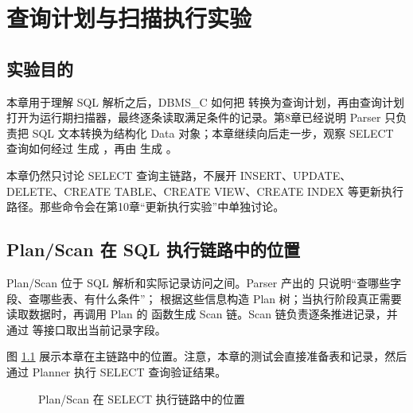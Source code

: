 \chapter{查询计划与扫描执行实验}
\label{chap:plan-scan}

\section{实验目的}
\label{sec:plan-scan-purpose}

本章用于理解 SQL 解析之后，DBMS\_C 如何把  转换为查询计划，再由查询计划打开为运行期扫描器，最终逐条读取满足条件的记录。第8章已经说明 Parser 只负责把 SQL 文本转换为结构化 Data 对象；本章继续向后走一步，观察 SELECT 查询如何经过  生成 ，再由  生成 。

本章仍然只讨论 SELECT 查询主链路，不展开 INSERT、UPDATE、DELETE、CREATE TABLE、CREATE VIEW、CREATE INDEX 等更新执行路径。那些命令会在第10章“更新执行实验”中单独讨论。

\section{Plan/Scan 在 SQL 执行链路中的位置}
\label{sec:plan-scan-position}

Plan/Scan 位于 SQL 解析和实际记录访问之间。Parser 产出的  只说明“查哪些字段、查哪些表、有什么条件”； 根据这些信息构造 Plan 树；当执行阶段真正需要读取数据时，再调用 Plan 的  函数生成 Scan 链。Scan 链负责逐条推进记录，并通过  等接口取出当前记录字段。

图 \ref{fig:plan-scan-position} 展示本章在主链路中的位置。注意，本章的测试会直接准备表和记录，然后通过 Planner 执行 SELECT 查询验证结果。

\begin{figure}[htbp]
  \centering
  \caption{Plan/Scan 在 SELECT 执行链路中的位置}
  \label{fig:plan-scan-position}
\end{figure}

